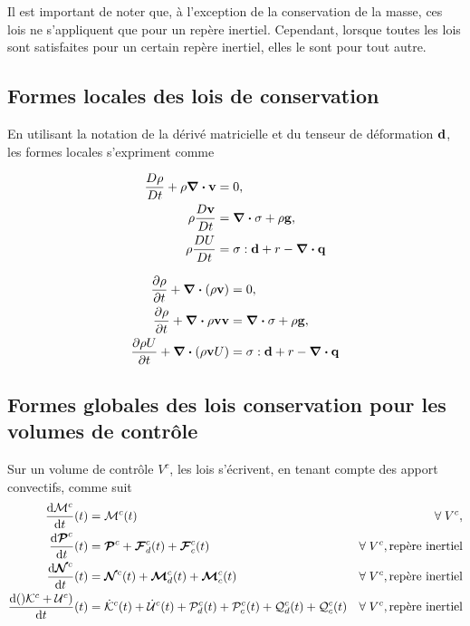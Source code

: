 \documentclass[a4paper,11pt]{report}
\newcommand{\bs}[1]{\boldsymbol{#1}}
\newcommand{\dvm}[2]{\frac{D #1}{D #2}}
\begin{document}
      Il est important de noter que, à l'exception de la conservation de la masse, ces lois ne s'appliquent que pour un repère inertiel. Cependant, lorsque toutes les lois sont satisfaites pour un certain repère inertiel, elles le sont pour tout autre.

    \subsection{Formes locales des lois de conservation}
      En utilisant la notation de la dérivé matricielle et du tenseur de déformation $\vb{d}$, les formes locales s'expriment comme
      \begin{multicols}{2}
        \begin{align}
          \dvm{\rho}{t} + \rho \div \vb{v} &= 0, \nonumber\\
          \rho \dvm{\vb{v}}{t} &= \div \sigma + \rho \vb{g},\nonumber\\
          \rho \dvm{U}{t} &= \vb{\sigma} : \vb{d} + r - \div \vb{q} \nonumber
        \end{align}

        \begin{align}
          \pdv{\rho}{t} + \div (\rho \vb{v}) &= 0, \nonumber \\
          \pdv{\rho}{t} + \div {\rho \vb{v} \vb{v}} &= \div \vb{\sigma} + \rho \vb{g}, \\
          \pdv{\rho U}{t} + \div (\rho \vb{v} U) &= \vb{\sigma} : \vb{d} + r - \div \vb{q} \nonumber
        \end{align}

      \end{multicols}

    \subsection{Formes globales des lois conservation pour les volumes de contrôle}
      Sur un volume de contrôle $V^c$, les lois s'écrivent, en tenant compte des apport convectifs, comme suit
      \begin{equation}\begin{aligned}
        \dv{\mathcal{M}^c}{t} {} (t) &= \mathcal{M}^c(t) & \forall \; V^c, \\
        \dv{\bs{\mathcal{P}}^c}{t} {} (t) &= \bs{\mathcal{P}}^c + \bs{\mathcal{F}}^c_d(t) + \bs{\mathcal{F}}^c_c(t) & \forall \; V^c, \textrm{repère inertiel} \\
        \dv{\bs{\mathcal{N}}^c}{t} {} (t) &= \bs{\mathcal{N}}^c(t) + \bs{\mathcal{M}}^c_d(t) + \bs{\mathcal{M}}^c_c(t) & \forall \; V^c, \textrm{repère inertiel} \\
        \dv{()\mathcal{K}^c + \mathcal{U}^c)}{t} {}(t) &= \dot{\mathcal{K}}^c (t) + \dot{\mathcal{U}}^c(t) + \mathcal{P}^c_d(t) + \mathcal{P}^c_c(t) + \mathcal{Q}^c_d (t) + \mathcal{Q}^c_c (t) &  \forall \; V^c, \textrm{repère inertiel}
      \end{aligned}\end{equation}
\end{document}
